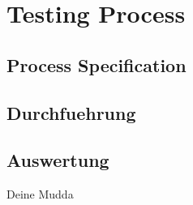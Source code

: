 \chapter{Testing Process}\label{testingprocess}

\section{Process Specification}
\section{Durchfuehrung}
\section{Auswertung}

Deine Mudda\cite{tedesco_simulation-based_2008} 
